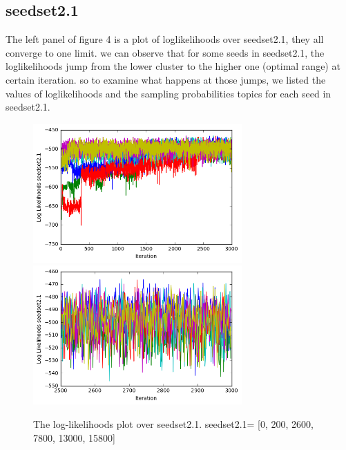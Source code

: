 \documentclass[11pt]{article}
\begin{document}
\begin{spacing}{1.6}
\subsection{seedset2.1}
\noindent The left panel of figure 4 is a plot of loglikelihoods over seedset2.1, they all converge to one limit. we can observe that for some seeds in seedset2.1, the loglikelihoods jump from the lower cluster to the higher one (optimal range) at certain iteration. so to examine what happens at those jumps, we listed the values of loglikelihoods and the sampling probabilities topics for each seed in seedset2.1.\\
\begin{minipage}{1.0\textwidth}
\begin{figure}[H]
\includegraphics[width = 80mm]{figure5.png}
\includegraphics[width = 80mm]{figure6.png}
\caption{The log-likelihoods plot over seedset2.1.  seedset2.1= [0, 200, 2600, 7800, 13000, 15800]}\scriptsize
\end{figure}
\end{minipage}\\



\end{spacing}
\end{document}
